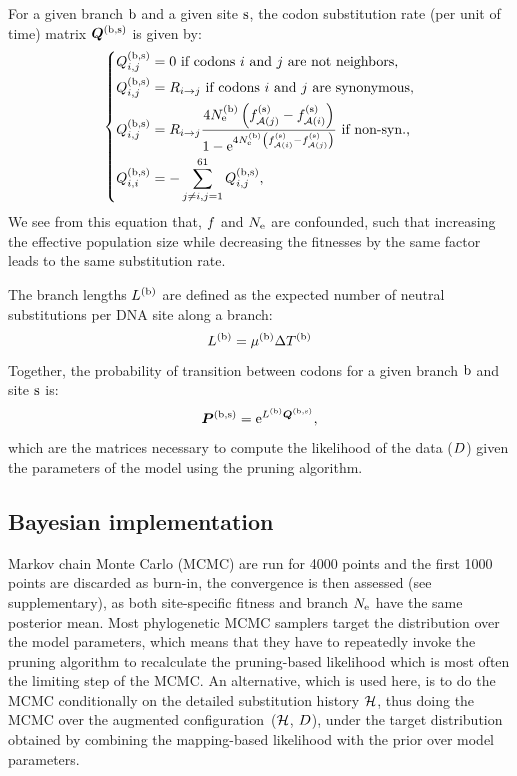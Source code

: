 \documentclass{MBE}
\begin{document}
	For a given branch $\text{b}$ and a given site $\text{s}$, the {codon} {substitution} rate (per unit of time) matrix $\bm{Q}^{(\text{b}, \text{s})}$ is given by:
	\begin{equation}
		\label{eq:subrates}
		\begin{dcases}
			\submatrix\branchsiteexp_{\itoj} = 0\text{ if codons $\ci$ and $\cj$ are not neighbors,} \\
			\submatrix\branchsiteexp_{\itoj} = \mutmatrix_{\nucitoj}\text{ if codons $\ci$ and $\cj$ are {synonymous},} \\
			\submatrix\branchsiteexp_{\itoj} = \mutmatrix_{\nucitoj} \dfrac{4\Ne\branchexp \left({\fitj\siteexp - \fiti\siteexp}\right)}{{1 - \e^{4\Ne\branchexp\left({\fiti\siteexp - \fitj\siteexp}\right)} }} \text{ if non-syn.,}\\
			\submatrix\branchsiteexp_{\ci, \ci} = - \sum\limits_{ \cj \neq \ci, \cj=1}^{61} \submatrix\branchsiteexp_{\itoj},
		\end{dcases}
	\end{equation}
	We see from this equation that, $f$ and $N_{\text{e}}$ are confounded, such that increasing the {effective population size} while decreasing the fitnesses by the same factor leads to the same {substitution} rate.

	The branch lengths $L^{(\text{b})}$ are defined as the expected number of {neutral} substitutions per {DNA} site along a branch:
	\begin{equation}
		\label{eq:branchlength}
		\branchlength\branchexp = \mu\branchexp \branchtime\branchexp
	\end{equation}
	Together, the probability of transition between codons for a given branch $\text{b}$ and site $\text{s}$ is:
	\begin{equation}
		\label{eq:Probmatrix}
		\Probmatrix\branchsiteexp = \e^{\branchlength\branchexp \Submatrix\branchsiteexp},
	\end{equation}
	which are the matrices necessary to compute the {likelihood} of the data ($D$) given the parameters of the model using the pruning algorithm.

	\subsection{Bayesian implementation}
	\label{sec:Bayesian}
	Markov chain Monte Carlo ({MCMC}) are run for 4000 points and the first 1000 points are discarded as burn-in, the convergence is then assessed (see supplementary), as both site-specific fitness and branch $N_{\text{e}}$ have the same {posterior} mean.
	Most phylogenetic {MCMC} samplers target the distribution over the model parameters, which means that they have to repeatedly invoke the pruning algorithm to recalculate the pruning-based {likelihood} which is most often the limiting step of the {MCMC}.
	An alternative, which is used here, is to do the {MCMC} conditionally on the detailed {substitution} history $\mathcal{H}$, thus doing the {MCMC} over the augmented configuration~($\mathcal{H}$, $D$), under the target distribution obtained by combining the mapping-based {likelihood} with the {prior} over model parameters.
\end{document}
